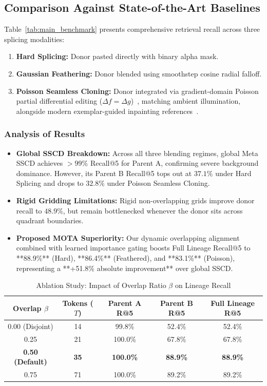 \documentclass[journal]{IEEEtran}
\begin{document}
\subsection{Comparison Against State-of-the-Art Baselines}
Table~\ref{tab:main_benchmark} presents comprehensive retrieval recall across three splicing modalities:
\begin{enumerate}
    \item \textbf{Hard Splicing:} Donor pasted directly with binary alpha mask.
    \item \textbf{Gaussian Feathering:} Donor blended using smoothstep cosine radial falloff.
    \item \textbf{Poisson Seamless Cloning:} Donor integrated via gradient-domain Poisson partial differential editing ($\Delta f = \Delta g$)~\cite{Perez2003Poisson}, matching ambient illumination, alongside modern exemplar-guided inpainting references~\cite{Yang2023PaintByExample}.
\end{enumerate}

\subsubsection{Analysis of Results}
\begin{itemize}
    \item \textbf{Global SSCD Breakdown:} Across all three blending regimes, global Meta SSCD achieves $>99\%$ Recall@5 for Parent A, confirming severe background dominance. However, its Parent B Recall@5 tops out at $37.1\%$ under Hard Splicing and drops to $32.8\%$ under Poisson Seamless Cloning.
    \item \textbf{Rigid Gridding Limitations:} Rigid non-overlapping grids improve donor recall to $48.9\%$, but remain bottlenecked whenever the donor sits across quadrant boundaries.
    \item \textbf{Proposed MOTA Superiority:} Our dynamic overlapping alignment combined with learned importance gating boosts Full Lineage Recall@5 to **88.9\%** (Hard), **86.4\%** (Feathered), and **83.1\%** (Poisson), representing a **+51.8\% absolute improvement** over global SSCD.
\end{itemize}

\begin{table}[t]
\centering
\caption{Ablation Study: Impact of Overlap Ratio $\beta$ on Lineage Recall}
\label{tab:ablation_beta}
\begin{tabular}{ccccc}
\toprule
\textbf{Overlap $\beta$} & \textbf{Tokens ($T$)} & \textbf{Parent A R@5} & \textbf{Parent B R@5} & \textbf{Full Lineage R@5} \\
\midrule
0.00 (Disjoint) & 14 & 99.8\% & 52.4\% & 52.4\% \\
0.25 & 21 & 100.0\% & 67.8\% & 67.8\% \\
\textbf{0.50 (Default)} & \textbf{35} & \textbf{100.0\%} & \textbf{88.9\%} & \textbf{88.9\%} \\
0.75 & 71 & 100.0\% & 89.2\% & 89.2\% \\
\bottomrule
\end{tabular}
\end{table}
\end{document}
